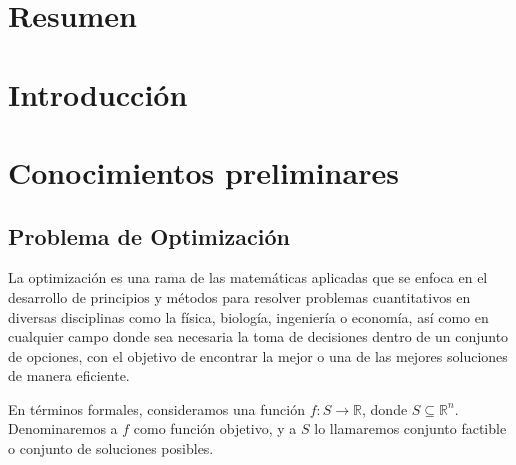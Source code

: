 \documentclass[12pt,titlepage,twoside,openright]{book}
\begin{document}
\frontmatter{}



\pagestyle{plain}


\tableofcontents
\newpage
\listoffigures




\mainmatter{}
\pagestyle{fancy}
\renewcommand{\chaptermark}[1]{%
	\markboth{\chaptername
		\ \thechapter.\ #1}{}}
\fancyhead[RO,LE]{\bfseries \thepage}
\fancyfoot{}
\setlength{\parindent}{0pt}
\setlength{\parskip}{1.5ex}



\chapter{Resumen}



\chapter{Introducci\'on}
\chapter{Conocimientos preliminares}
\section{Problema de Optimizaci\'on}

La optimizaci\'on es una rama de las matem\'aticas aplicadas que se enfoca en el desarrollo de principios y m\'etodos para resolver problemas cuantitativos en diversas disciplinas como la f\'isica, biolog\'ia, ingenier\'ia o econom\'ia, as\'i como en cualquier campo donde sea necesaria la toma de decisiones dentro de un conjunto de opciones, con el objetivo de encontrar la mejor o una de las mejores soluciones de manera eficiente.

En t\'erminos formales, consideramos una funci\'on \( f : S \rightarrow \mathbb{R} \), donde \( S \subseteq \mathbb{R}^n \). Denominaremos a \( f \) como funci\'on objetivo, y a \( S \) lo llamaremos conjunto factible o conjunto de soluciones posibles.
\end{document}
